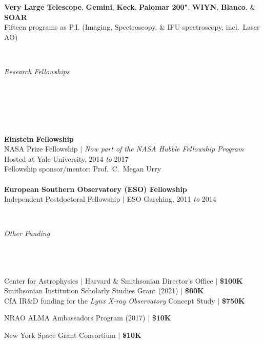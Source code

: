 \documentclass[11pt]{article}
\begin{document}
\vspace{4mm}

\hspace{42mm} \parbox{5.15in}{\textbf{Very Large Telescope}, \textbf{Gemini}, \textbf{Keck}, \textbf{Palomar 200"}, \textbf{WIYN}, \textbf{Blanco}, \& \textbf{SOAR} \\ Fifteen programs as P.I. (Imaging, Spectroscopy, \& IFU spectroscopy, incl.~Laser AO)} \\

\vspace{6mm}


\hspace{2.5mm} \parbox{1.5in}{\textit{Research Fellowships \\ \\ \\ \\ \\ \\}} \parbox{5.15in}{\textbf{Einstein Fellowship} \\ NASA Prize Fellowship $|$ \textit{Now part of the NASA Hubble Fellowship Program}
\\ Hosted at Yale University, 2014 \textit{to} 2017
\\ Fellowship sponsor/mentor: Prof.~C.~Megan Urry
\\ \\ \textbf{European Southern Observatory (ESO) Fellowship} \\ Independent Postdoctoral Fellowship $|$ ESO Garching, 2011 \textit{to} 2014} \\

\vspace{6mm}

\hspace{2.5mm} \parbox{1.5in}{\textit{Other Funding \\\\\\\\}}
\parbox{5.15in}{
Center for Astrophysics $|$ Harvard \& Smithsonian Director's Office $|$ \textbf{\$100K}\\
Smithsonian Institution Scholarly Studies Grant (2021) $|$ \textbf{\$60K} \\
CfA IR\&D funding for the \textit{Lynx X-ray Observatory} Concept Study $|$ \textbf{\$750K}

NRAO ALMA Ambassadors Program (2017) $|$ \textbf{\$10K}

New York Space Grant Consortium $|$ \textbf{\$10K}
}
\end{document}
